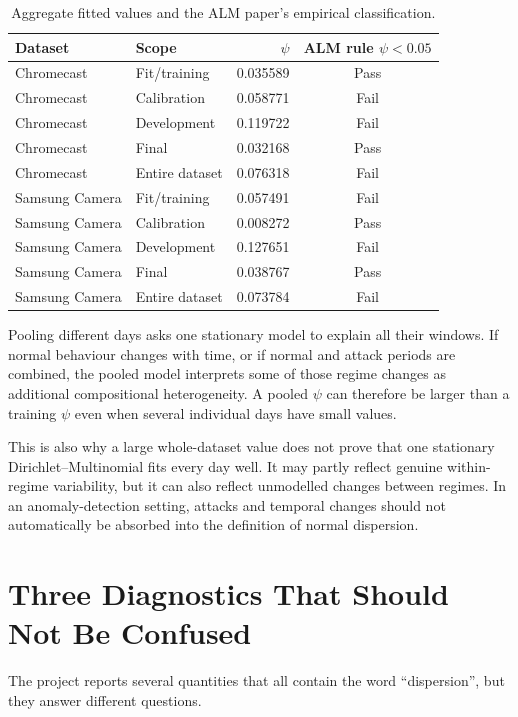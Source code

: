 \documentclass[11pt,a4paper]{article}
\begin{document}
\begin{table}[htbp]
\centering
\caption{Aggregate fitted values and the ALM paper's empirical classification.}
\label{tab:aggregate}
\begin{tabular}{llrc}
\toprule
Dataset & Scope & $\psi$ & ALM rule $\psi<0.05$ \\
\midrule
Chromecast & Fit/training & 0.035589 & Pass \\
Chromecast & Calibration & 0.058771 & Fail \\
Chromecast & Development & 0.119722 & Fail \\
Chromecast & Final & 0.032168 & Pass \\
Chromecast & Entire dataset & 0.076318 & Fail \\
\addlinespace
Samsung Camera & Fit/training & 0.057491 & Fail \\
Samsung Camera & Calibration & 0.008272 & Pass \\
Samsung Camera & Development & 0.127651 & Fail \\
Samsung Camera & Final & 0.038767 & Pass \\
Samsung Camera & Entire dataset & 0.073784 & Fail \\
\bottomrule
\end{tabular}
\end{table}

Pooling different days asks one stationary model to explain all their windows.
If normal behaviour changes with time, or if normal and attack periods are
combined, the pooled model interprets some of those regime changes as
additional compositional heterogeneity.  A pooled $\psi$ can therefore be
larger than a training $\psi$ even when several individual days have small
values.

This is also why a large whole-dataset value does not prove that one stationary
Dirichlet--Multinomial fits every day well.  It may partly reflect genuine
within-regime variability, but it can also reflect unmodelled changes between
regimes.  In an anomaly-detection setting, attacks and temporal changes should
not automatically be absorbed into the definition of normal dispersion.

\section{Three Diagnostics That Should Not Be Confused}

The project reports several quantities that all contain the word
``dispersion'', but they answer different questions.
\end{document}
